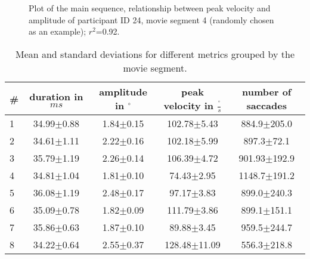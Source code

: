 \documentclass[10pt,a4paper]{extarticle}
\begin{document}
\onecolumn

\begin{figure}
\centering
        \caption[Main sequence plot]{Plot of the main sequence, relationship between peak velocity and amplitude of participant ID 24, movie segment 4 (randomly chosen as an example); $r^2$=0.92.}
        \label{main}
\end{figure}   
\begin{table}[h]
\center
\begin{tabular}{lcccc}
\toprule
\# & duration in $ms$  & amplitude in $^\circ$ & peak velocity in $\frac{^\circ} {s}$ & number of saccades \\
\midrule
1	& 	34.99$\pm$0.88 	& 	1.84$\pm$0.15   & 	102.78$\pm$5.43 	& 	884.9$\pm$205.0  	\\
2 	& 	34.61$\pm$1.11 	&	2.22$\pm$0.16	&  	102.18$\pm$5.99		& 	897.3$\pm$72.1 		\\
3	&   35.79$\pm$1.19	&   2.26$\pm$0.14 	&  	106.39$\pm$4.72		& 	901.93$\pm$192.9 	\\
4 	& 	34.81$\pm$1.04 	&  	1.81$\pm$0.10 	& 	74.43$\pm$2.95		&	1148.7$\pm$191.2 	\\
5 	& 	36.08$\pm$1.19 	&	2.48$\pm$0.17 	& 	97.17$\pm$3.83 		& 	899.0$\pm$240.3 	\\
6	& 	35.09$\pm$0.78 	& 	1.82$\pm$0.09 	& 	111.79$\pm$3.86 	&	899.1$\pm$151.1 	\\
7	& 	35.86$\pm$0.63	& 	1.87$\pm$0.10 	&  	89.88$\pm$3.45		& 	959.5$\pm$244.7		\\
8	& 	34.22$\pm$0.64 	& 	2.55$\pm$0.37 	& 	128.48$\pm$11.09	& 	556.3$\pm$218.8		\\

\bottomrule

\end{tabular}
\caption {Mean and standard deviations for different metrics grouped by the movie segment.}
\label{rundetails1} 
\end{table}
\end{document}
